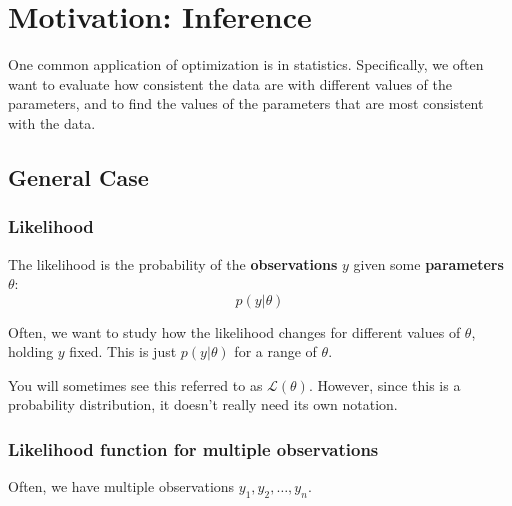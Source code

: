 \documentclass[
  letterpaper,
  DIV=11,
  numbers=noendperiod]{scrreprt}
\begin{document}
\section{Motivation: Inference}\label{motivation-inference}

One common application of optimization is in statistics. Specifically,
we often want to evaluate how consistent the data are with different
values of the parameters, and to find the values of the parameters that
are most consistent with the data.

\subsection{General Case}\label{general-case}

\subsubsection{Likelihood}\label{likelihood}

The likelihood is the probability of the \textbf{observations} \(y\)
given some \textbf{parameters} \(\theta\): \[
p(y | \theta)
\]

Often, we want to study how the likelihood changes for different values
of \(\theta\), holding \(y\) fixed. This is just \(p(y | \theta)\) for a
range of \(\theta\).

\begin{tcolorbox}[enhanced jigsaw, arc=.35mm, breakable, title=\textcolor{quarto-callout-note-color}{\faInfo}\hspace{0.5em}{Note}, coltitle=black, opacityback=0, bottomtitle=1mm, colback=white, left=2mm, opacitybacktitle=0.6, toptitle=1mm, colframe=quarto-callout-note-color-frame, leftrule=.75mm, titlerule=0mm, rightrule=.15mm, bottomrule=.15mm, colbacktitle=quarto-callout-note-color!10!white, toprule=.15mm]

You will sometimes see this referred to as \(\mathcal{L}(\theta)\).
However, since this is a probability distribution, it doesn't really
need its own notation.

\end{tcolorbox}

\subsubsection{Likelihood function for multiple
observations}\label{likelihood-function-for-multiple-observations}

Often, we have multiple observations \(y_1, y_2, \ldots, y_n\).
\end{document}
